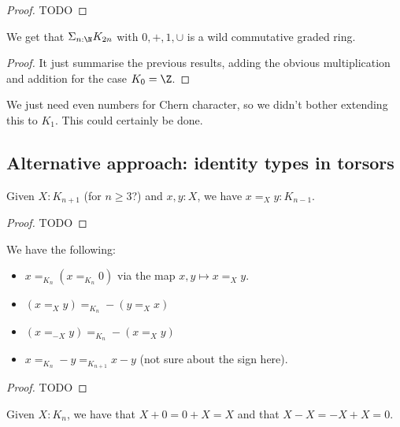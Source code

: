 \begin{proof}
TODO
\end{proof}

\begin{proposition}
We get that $\Sigma_{n:\N}K_{2n}$ with $0,+,1,\cup$ is a wild commutative graded ring.
\end{proposition}

\begin{proof}
It just summarise the previous results, adding the obvious multiplication and addition for the case $K_0 = \Z$.
\end{proof}

\begin{remark}
We just need even numbers for Chern character, so we didn't bother extending this to $K_1$. This could certainly be done.
\end{remark}




\subsection{Alternative approach: identity types in torsors}

\begin{lemma}
Given $X:K_{n+1}$ (for $n\geq 3$?) and $x,y:X$, we have $x=_Xy : K_{n-1}$.
\end{lemma}

\begin{proof}
TODO
\end{proof}

\begin{lemma}\label{sign-properties}
We have the following:
\begin{itemize}
\item $x =_{K_n} (x=_{K_n}0)$ via the map $x,y\mapsto x=_Xy$.
\item $(x=_Xy) =_{K_n} -(y=_Xx)$
\item $(x=_{-X}y) =_{K_n} -(x=_Xy)$
\item $x=_{K_n}-y =_{K_{n+1}} x-y$ (not sure about the sign here).
\end{itemize}
\end{lemma}

\begin{proof}
TODO
\end{proof}

\begin{corollary}
Given $X:K_n$, we have that $X+0 = 0+X = X$ and that $X-X = -X+X = 0$.
\end{corollary}



